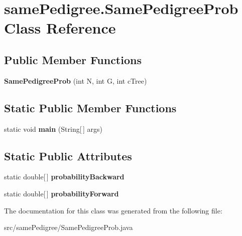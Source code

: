 \hypertarget{classsame_pedigree_1_1_same_pedigree_prob}{}\section{same\+Pedigree.\+Same\+Pedigree\+Prob Class Reference}
\label{classsame_pedigree_1_1_same_pedigree_prob}
\subsection*{Public Member Functions}
\begin{DoxyCompactItemize}
\item 
\hypertarget{classsame_pedigree_1_1_same_pedigree_prob_ad574a58ae80b1f0cf42b8e86e0ea27de}{}{\bfseries Same\+Pedigree\+Prob} (int N, int G, int c\+Tree)\label{classsame_pedigree_1_1_same_pedigree_prob_ad574a58ae80b1f0cf42b8e86e0ea27de}

\end{DoxyCompactItemize}
\subsection*{Static Public Member Functions}
\begin{DoxyCompactItemize}
\item 
\hypertarget{classsame_pedigree_1_1_same_pedigree_prob_a4fc95ce805b743fdab4c6dfa95ea0d52}{}static void {\bfseries main} (String\mbox{[}$\,$\mbox{]} args)\label{classsame_pedigree_1_1_same_pedigree_prob_a4fc95ce805b743fdab4c6dfa95ea0d52}

\end{DoxyCompactItemize}
\subsection*{Static Public Attributes}
\begin{DoxyCompactItemize}
\item 
\hypertarget{classsame_pedigree_1_1_same_pedigree_prob_abff2a1f1ff78c3d6549b8cf80845fef1}{}static double\mbox{[}$\,$\mbox{]} {\bfseries probability\+Backward}\label{classsame_pedigree_1_1_same_pedigree_prob_abff2a1f1ff78c3d6549b8cf80845fef1}

\item 
\hypertarget{classsame_pedigree_1_1_same_pedigree_prob_a467422259738fd1a4e8095300cc237d4}{}static double\mbox{[}$\,$\mbox{]} {\bfseries probability\+Forward}\label{classsame_pedigree_1_1_same_pedigree_prob_a467422259738fd1a4e8095300cc237d4}

\end{DoxyCompactItemize}


The documentation for this class was generated from the following file\+:\begin{DoxyCompactItemize}
\item 
src/same\+Pedigree/Same\+Pedigree\+Prob.\+java\end{DoxyCompactItemize}
